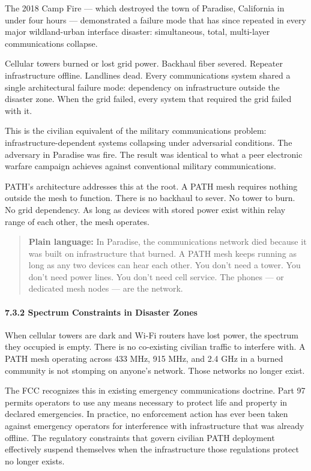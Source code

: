 \documentclass[
  11pt,
]{article}
\begin{document}
The 2018 Camp Fire --- which destroyed the town of Paradise, California
in under four hours --- demonstrated a failure mode that has since
repeated in every major wildland-urban interface disaster: simultaneous,
total, multi-layer communications collapse.

Cellular towers burned or lost grid power. Backhaul fiber severed.
Repeater infrastructure offline. Landlines dead. Every communications
system shared a single architectural failure mode: dependency on
infrastructure outside the disaster zone. When the grid failed, every
system that required the grid failed with it.

This is the civilian equivalent of the military communications problem:
infrastructure-dependent systems collapsing under adversarial
conditions. The adversary in Paradise was fire. The result was identical
to what a peer electronic warfare campaign achieves against conventional
military communications.

PATH's architecture addresses this at the root. A PATH mesh requires
nothing outside the mesh to function. There is no backhaul to sever. No
tower to burn. No grid dependency. As long as devices with stored power
exist within relay range of each other, the mesh operates.

\begin{quote}
\textbf{Plain language:} In Paradise, the communications network died
because it was built on infrastructure that burned. A PATH mesh keeps
running as long as any two devices can hear each other. You don't need a
tower. You don't need power lines. You don't need cell service. The
phones --- or dedicated mesh nodes --- are the network.
\end{quote}

\hypertarget{spectrum-constraints-in-disaster-zones}{%
\paragraph{7.3.2 Spectrum Constraints in Disaster
Zones}\label{spectrum-constraints-in-disaster-zones}}

When cellular towers are dark and Wi-Fi routers have lost power, the
spectrum they occupied is empty. There is no co-existing civilian
traffic to interfere with. A PATH mesh operating across 433 MHz, 915
MHz, and 2.4 GHz in a burned community is not stomping on anyone's
network. Those networks no longer exist.

The FCC recognizes this in existing emergency communications doctrine.
Part 97 permits operators to use any means necessary to protect life and
property in declared emergencies. In practice, no enforcement action has
ever been taken against emergency operators for interference with
infrastructure that was already offline. The regulatory constraints that
govern civilian PATH deployment effectively suspend themselves when the
infrastructure those regulations protect no longer exists.
\end{document}
